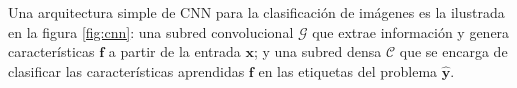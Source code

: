 Una arquitectura simple de CNN para la clasificación de imágenes es la ilustrada en la figura \ref{fig:cnn}: una subred
convolucional $\mathcal{G}$ que extrae información y genera características $\mathbf{f}$ a partir de la entrada
$\mathbf{x}$; y una subred densa $\mathcal{C}$ que se encarga de clasificar las características aprendidas $\mathbf{f}$
en las etiquetas del problema $\mathbf{\hat{y}}$.

\begin{figure}[H]
  \centering


  \begin{tikzpicture}[x=0.75pt,y=0.75pt,yscale=-1,xscale=1]


\end{tikzpicture}
\end{figure}
